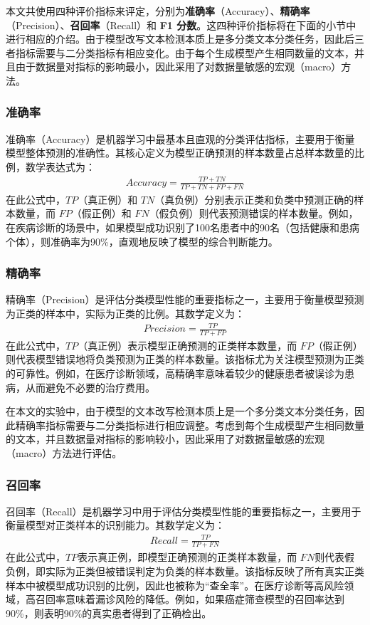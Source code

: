 本文共使用四种评价指标来评定，分别为\textbf{准确率}（Accuracy）、\textbf{精确率}（Precision）、\textbf{召回率}（Recall）和 \textbf{F1 分数}。这四种评价指标将在下面的小节中进行相应的介绍。由于模型改写文本检测本质上是多分类文本分类任务，因此后三者指标需要与二分类指标有相应变化。由于每个生成模型产生相同数量的文本，并且由于数据量对指标的影响最小，因此采用了对数据量敏感的宏观（macro）方法。

\subsubsection{准确率}

准确率（Accuracy）是机器学习中最基本且直观的分类评估指标，主要用于衡量模型整体预测的准确性。其核心定义为模型正确预测的样本数量占总样本数量的比例，数学表达式为：
\begin{align}
    Accuracy = \frac{TP+TN}{TP+TN+FP+FN}
\end{align}
在此公式中，\(TP\)（真正例）和 \(TN\)（真负例）分别表示正类和负类中预测正确的样本数量，而 \(FP\)（假正例）和 \(FN\)（假负例）则代表预测错误的样本数量。例如，在疾病诊断的场景中，如果模型成功识别了100名患者中的90名（包括健康和患病个体），则准确率为90\%，直观地反映了模型的综合判断能力。

\subsubsection{精确率}

精确率（Precision）是评估分类模型性能的重要指标之一，主要用于衡量模型预测为正类的样本中，实际为正类的比例。其数学定义为：
\begin{align}
    Precision = \frac{TP}{TP+FP}
\end{align}
在此公式中，\(TP\)（真正例）表示模型正确预测的正类样本数量，而 \(FP\)（假正例）则代表模型错误地将负类预测为正类的样本数量。该指标尤为关注模型预测为正类的可靠性。例如，在医疗诊断领域，高精确率意味着较少的健康患者被误诊为患病，从而避免不必要的治疗费用。

在本文的实验中，由于模型的文本改写检测本质上是一个多分类文本分类任务，因此精确率指标需要与二分类指标进行相应调整。考虑到每个生成模型产生相同数量的文本，并且数据量对指标的影响较小，因此采用了对数据量敏感的宏观（macro）方法进行评估。

\subsubsection{召回率}

召回率（Recall）是机器学习中用于评估分类模型性能的重要指标之一，主要用于衡量模型对正类样本的识别能力。其数学定义为：
\begin{align}
    Recall = \frac{TP}{TP+FN}
\end{align}
在此公式中，\(TP\)表示真正例，即模型正确预测的正类样本数量，而 \(FN\)则代表假负例，即实际为正类但被错误判定为负类的样本数量。该指标反映了所有真实正类样本中被模型成功识别的比例，因此也被称为“查全率”。在医疗诊断等高风险领域，高召回率意味着漏诊风险的降低。例如，如果癌症筛查模型的召回率达到90\%，则表明90\%的真实患者得到了正确检出。

